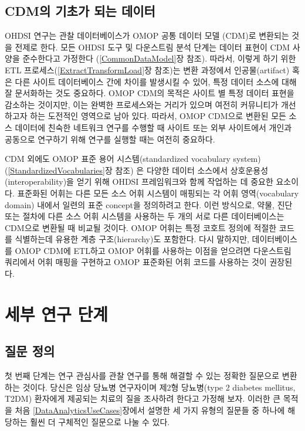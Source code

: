 \documentclass[11pt]{book}
\theoremstyle{definition}
\theoremstyle{definition}
\theoremstyle{definition}
\theoremstyle{remark}
\begin{document}
\subsection{CDM의 기초가 되는 데이터}\label{cdm---}

OHDSI 연구는 관찰 데이터베이스가 OMOP 공통 데이터 모델 (CDM)로 변환되는
것을 전제로 한다. 모든 OHDSI 도구 및 다운스트림 분석 단계는 데이터
표현이 CDM 사양을 준수한다고 가정한다 (\ref{CommonDataModel}장 참조).
따라서, 이렇게 하기 위한 ETL 프로세스(\ref{ExtractTransformLoad}장
참조)는 변환 과정에서 인공물(artifact) 혹은 다른 사이트 데이터베이스
간에 차이를 발생시킬 수 있어, 특정 데이터 소스에 대해 잘 문서화하는 것도
중요하다. OMOP CDM의 목적은 사이트 별 특정 데이터 표현을 감소하는
것이지만, 이는 완벽한 프로세스와는 거리가 있으며 여전히 커뮤니티가
개선하고자 하는 도전적인 영역으로 남아 있다. 따라서, OMOP CDM으로 변환된
모든 소스 데이터에 친숙한 네트워크 연구를 수행할 때 사이트 또는 외부
사이트에서 개인과 공동으로 연구하기 위해 연구를 실행할 때는 여전히
중요하다.

CDM 외에도 OMOP 표준 용어 시스템(standardized vocabulary system)
(\ref{StandardizedVocabularies}장 참조) 은 다양한 데이터 소스에서
상호운용성(interoperability)을 얻기 위해 OHDSI 프레임워크와 함께
작업하는 데 중요한 요소이다. 표준화된 어휘는 다른 모든 소스 어휘
시스템이 매핑되는 각 어휘 영역(vocabulary domain) 내에서 일련의 표준
concept을 정의하려고 한다. 이런 방식으로, 약물, 진단 또는 절차에 다른
소스 어휘 시스템을 사용하는 두 개의 서로 다른 데이터베이스는 CDM으로
변환될 때 비교될 것이다. OMOP 어휘는 특정 코호트 정의에 적절한 코드를
식별하는데 유용한 계층 구조(hierarchy)도 포함한다. 다시 말하지만,
데이터베이스를 OMOP CDM에 ETL하고 OMOP 어휘를 사용하는 이점을 얻으려면
다운스트림 쿼리에서 어휘 매핑을 구현하고 OMOP 표준화된 어휘 코드를
사용하는 것이 권장된다.

\section{세부 연구 단계}\label{--}

\subsection{질문 정의}\label{-}

첫 번째 단계는 연구 관심사를 관찰 연구를 통해 해결할 수 있는 정확한
질문으로 변환하는 것이다. 당신은 임상 당뇨병 연구자이며 제2형
당뇨병(type 2 diabetes mellitus, T2DM) 환자에게 제공되는 치료의 질을
조사하려 한다고 가정해 보자. 이러한 큰 목적을 처음
\ref{DataAnalyticsUseCases}장에서 설명한 세 가지 유형의 질문들 중 하나에
해당하는 훨씬 더 구체적인 질문으로 나눌 수 있다.
\end{document}
